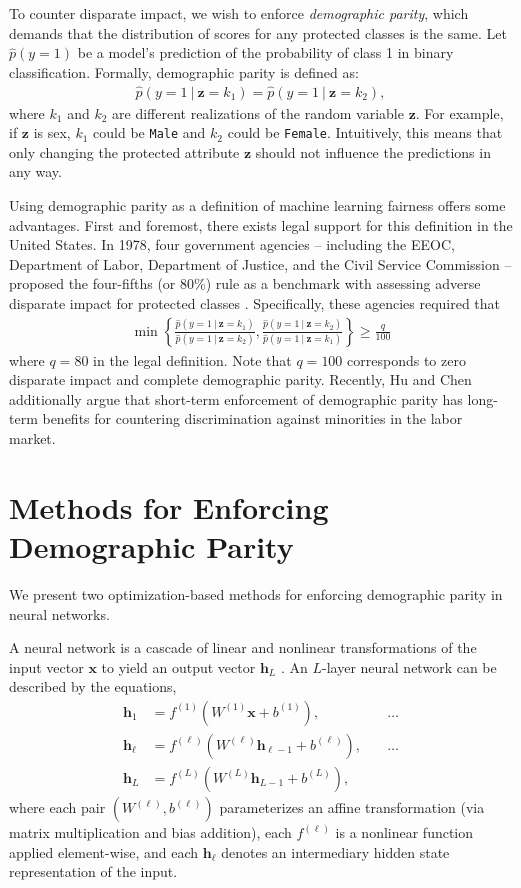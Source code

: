 \documentclass{article}
\newcommand\given[1][]{\:#1\vert\:}
\newcommand{\bd}[1]{\boldsymbol{#1}}
\newcommand{\hp}{\hat{p}}
\newcommand{\idx}[3][]{{#2}^{(#3)}_{#1}}
\begin{document}
To counter disparate impact, we wish to enforce \emph{demographic parity}, which demands that the distribution of scores for any protected classes is the same.  Let $\hat{p}(y = 1)$ be a model's prediction of the probability of class 1 in binary classification.  Formally, demographic parity is defined as:
\begin{align}
\hp(y = 1 \given \bd z = k_1) = \hp(y = 1 \given \bd z = k_2),
\end{align}  
where $k_1$ and $k_2$ are different realizations of the random variable $\bd z$.  For example, if $\bd z$ is sex, $k_1$ could be \texttt{Male} and $k_2$ could be \texttt{Female}.  Intuitively, this means that only changing the protected attribute $\bd z$ should not influence the predictions in any way.  

Using demographic parity as a definition of machine learning fairness offers some advantages.  First and foremost, there exists legal support for this definition in the United States.  In 1978, four government agencies -- including the EEOC, Department of Labor, Department of Justice, and the Civil Service Commission -- proposed the four-fifths (or 80\%) rule as a benchmark with assessing adverse disparate impact for protected classes \citep{bobko2004four}.  Specifically, these agencies required that
\begin{align}
\min \left\{\frac{\hp(y = 1 \given \bd z = k_1)}{\hp(y = 1 \given \bd z = k_2)}, \frac{\hp(y = 1 \given \bd z = k_2)}{\hp(y = 1 \given \bd z = k_1)} \right\} \geq \frac{q}{100} \label{q-rule}
\end{align} 
where $q = 80$ in the legal definition.  Note that $q = 100$ corresponds to zero disparate impact and complete demographic parity.  Recently, Hu and Chen  additionally argue that short-term enforcement of demographic parity has long-term benefits for countering discrimination against minorities in the labor market.  

\section{Methods for Enforcing Demographic Parity}
We present two optimization-based methods for enforcing demographic parity in neural networks.  

A neural network is a cascade of linear and nonlinear transformations of the input vector $\bd x$ to yield an output vector $\bd h_L$ \citep{goodfellow2016deep}.  An $L$-layer neural network can be described by the equations,
\begin{align}
\bd h_1 &= \idx f {1}(\idx W {1} \bd x + \idx b {1}), & \quad \ldots  \label{nn-def} \\
\bd h_\ell &= \idx f {\ell}(\idx W {\ell} \bd h_{\ell - 1} + \idx b {\ell}), & \quad \ldots\nonumber \\
\bd h_L &= \idx f {L}(\idx W {L} \bd h_{L-1} + \idx b {L}), \nonumber
\end{align}  
where each pair $(\idx W \ell, \idx b \ell)$ parameterizes an affine transformation (via matrix multiplication and bias addition), each $\idx f \ell$ is a nonlinear function applied element-wise, and each $\bd h_\ell$ denotes an intermediary hidden state representation of the input.  
\end{document}
